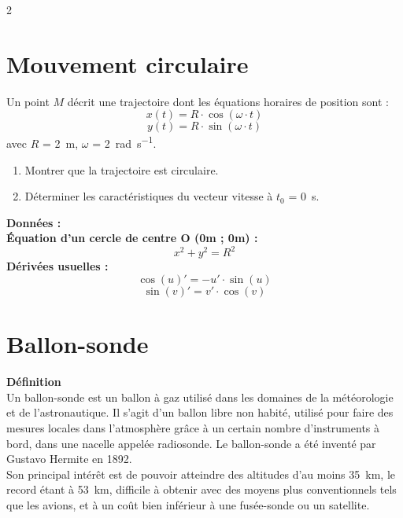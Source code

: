 \documentclass[a4paper,11pt,fleqn]{article}%
\begin{document}
\begin{multicols}{2}
\section{Mouvement circulaire}
Un point $M$ décrit une trajectoire dont les équations horaires de position sont : $$x(t) = R \cdot \cos{(\omega \cdot t)}$$
$$y(t) = R \cdot \sin{(\omega \cdot t)}$$
avec $R$ = \SI{2}{m}, $\omega$ = \SI{2}{\radian\per\second}.
\begin{enumerate}
	\item Montrer que la trajectoire est circulaire.
	\item Déterminer les caractéristiques du vecteur vitesse à $t_0$ = \SI{0}{s}.
\end{enumerate}
\noindent \colorbox{red!10}{\begin{minipage}{.48\textwidth}
\textbf{Données : }\\
\textbf{Équation d'un cercle de centre O (0m ; 0m) : } $$x^2 + y^2 = R^2$$
\textbf{Dérivées usuelles :} $$\cos{(u)}' = -u'\cdot \sin{(u)}$$
$$\sin{(v)'} = v' \cdot \cos{(v)}$$
\end{minipage}}

\section{Ballon-sonde}
\noindent \colorbox{orange!10}{\begin{minipage}{.48\textwidth}
\textbf{Définition}\\
Un ballon-sonde est un ballon à gaz utilisé dans les domaines de la météorologie et de l'astronautique. Il s'agit d'un ballon libre non habité, utilisé pour faire des mesures locales dans l'atmosphère grâce à un certain nombre d'instruments à bord, dans une nacelle appelée radiosonde. Le ballon-sonde a été inventé par Gustavo Hermite en 1892.\\
Son principal intérêt est de pouvoir atteindre des altitudes d'au moins \SI{35}{km}, le record étant à \SI{53}{km}, difficile à obtenir avec des moyens plus conventionnels tels que les avions, et à un coût bien inférieur à une fusée-sonde ou un satellite.
\end{minipage}}


\end{multicols}
\end{document}

